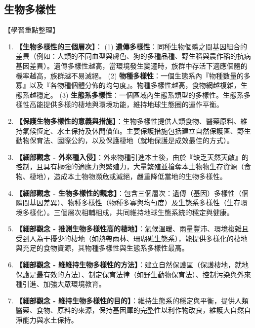 \documentclass[11pt,a4paper]{article}
\begin{document}
\subsection{生物多樣性}
\begin{learningpoints}{【學習重點整理】}
\begin{enumerate}[label=\arabic*.]
  \item \textbf{【生物多樣性的三個層次】}：
  (1) \textbf{遺傳多樣性}：同種生物個體之間基因組合的差異（例如：人類的不同血型與膚色、狗的多種品種、野生稻與農作稻的抗病基因差異）。遺傳多樣性越高，當環境發生變遷時，族群中存活下適應個體的機率越高，族群越不易滅絕。
  (2) \textbf{物種多樣性}：一個生態系內『物種數量的多寡』以及『各物種個體分佈的均勻度』。物種多樣性越高，食物網越複雜，生態系越穩定。
  (3) \textbf{生態系多樣性}：一個區域內生態系類型的多樣性。生態系多樣性高能提供多樣的棲地與環境功能，維持地球生態圈的運作平衡。
  \item \textbf{【保護生物多樣性的意義與措施】}：生物多樣性提供人類食物、醫藥原料、維持氣候恆定、水土保持及休閒價值。主要保護措施包括建立自然保護區、野生動物保育法、國際公約，以及保護棲地（就地保護是成效最佳的方式）。
  \item \textbf{【細部觀念 - 外來種入侵】}：外來物種引進本土後，由於『缺乏天然天敵』的控制，且具有極強的適應力與繁殖力，大量繁殖並搶奪本土物物生存資源（食物、棲地），造成本土物物瀕危或滅絕，嚴重降低當地的生物多樣性。
  \item \textbf{【細部觀念 - 生物多樣性的觀念】}：包含三個層次：遺傳（基因）多樣性（個體間基因差異）、物種多樣性（物種多寡與均勻度）及生態系多樣性（生存環境多樣化）。三個層次相輔相成，共同維持地球生態系統的穩定與健康。
  \item \textbf{【細部觀念 - 推測生物多樣性高的棲地】}：氣候溫暖、雨量豐沛、環境複雜且受到人為干擾少的棲地（如熱帶雨林、珊瑚礁生態系），能提供多樣化的棲地與充足的食物資源，其物種多樣性與生態系多樣性最高。
  \item \textbf{【細部觀念 - 維維持生物多樣性的方法】}：建立自然保護區（保護棲地，就地保護是最有效的方法）、制定保育法律（如野生動物保育法）、控制污染與外來種引進、加強大眾環境教育。
  \item \textbf{【細部觀念 - 維持生物多樣性的目的】}：維持生態系的穩定與平衡，提供人類醫藥、食物、原料的來源，保持基因庫的完整性以利作物改良，維護大自然自淨能力與水土保持。
\end{enumerate}
\end{learningpoints}
\end{document}
